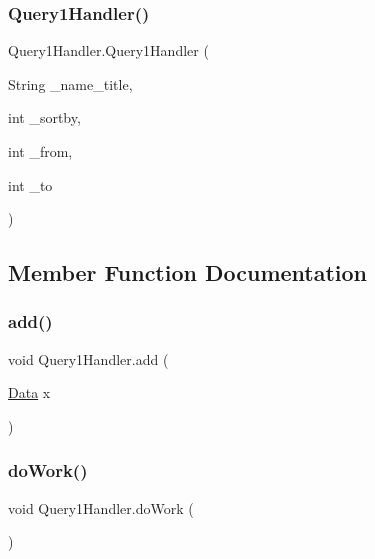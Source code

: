 \subsubsection{\texorpdfstring{Query1\+Handler()}{Query1Handler()}}
{\footnotesize\ttfamily Query1\+Handler.\+Query1\+Handler (\begin{DoxyParamCaption}\item[{String}]{\+\_\+name\+\_\+title,  }\item[{int}]{\+\_\+sortby,  }\item[{int}]{\+\_\+from,  }\item[{int}]{\+\_\+to }\end{DoxyParamCaption})}



\subsection{Member Function Documentation}
\hypertarget{class_query1_handler_a217ca3f99ec7cc755592185c5a639be1}{}\label{class_query1_handler_a217ca3f99ec7cc755592185c5a639be1} 
\subsubsection{\texorpdfstring{add()}{add()}}
{\footnotesize\ttfamily void Query1\+Handler.\+add (\begin{DoxyParamCaption}\item[{\hyperlink{class_data}{Data}}]{x }\end{DoxyParamCaption})}

\hypertarget{class_query1_handler_ab3667be62a56c75f35e951d609b9a253}{}\label{class_query1_handler_ab3667be62a56c75f35e951d609b9a253} 
\subsubsection{\texorpdfstring{do\+Work()}{doWork()}}
{\footnotesize\ttfamily void Query1\+Handler.\+do\+Work (\begin{DoxyParamCaption}{ }\end{DoxyParamCaption})}

\hypertarget{class_query1_handler_a4e48d3e6ee1d7f644eeb165c980ac1b6}{}\label{class_query1_handler_a4e48d3e6ee1d7f644eeb165c980ac1b6} 

